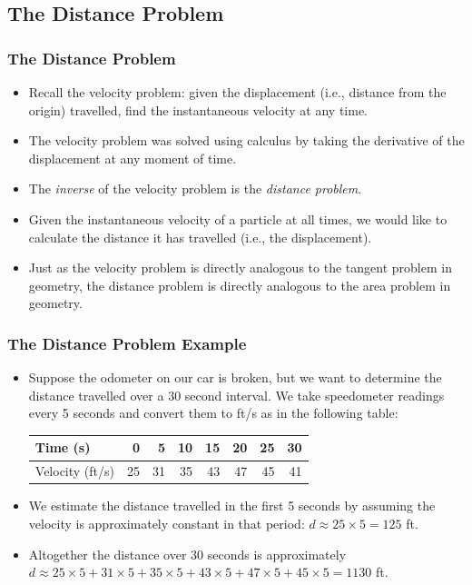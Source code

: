 \documentclass[serif,ignorenonframetext]{beamer}
\begin{document}
\subsection{The Distance Problem}

\begin{frame}
  \frametitle{The Distance Problem}
  \begin{itemize}[<+->]
  \item Recall the velocity problem: given the displacement (i.e.,
    distance from the origin) travelled, find the instantaneous
    velocity at any time.
  \item The velocity problem was solved using calculus by taking the
    derivative of the displacement at any moment of time.
  \item The \emph{inverse} of the velocity problem is the
    \emph{distance problem}.
  \item Given the instantaneous velocity of a particle at all times,
    we would like to calculate the distance it has travelled (i.e.,
    the displacement).
  \item Just as the velocity problem is directly analogous to the
    tangent problem in geometry, the distance problem is directly
    analogous to the area problem in geometry.
  \end{itemize}
\end{frame}

\begin{frame}
  \frametitle{The Distance Problem Example}
  \begin{itemize}[<+->]
  \item Suppose the odometer on our car is broken, but we want to
    determine the distance travelled over a 30 second interval.  We
    take speedometer readings every 5 seconds and convert them to ft/s
    as in the following table:
    \begin{tabular}{|l|r|r|r|r|r|r|r|}
      \hline
      Time (s) & 0 & 5 & 10 & 15 & 20 & 25 & 30 \\
      \hline
      Velocity (ft/s) & 25 & 31 & 35 & 43 & 47 & 45 & 41 \\
      \hline
    \end{tabular}
  \item We estimate the distance travelled in the first 5 seconds by
    assuming the velocity is approximately constant in that period:
    $d\approx 25\times 5=125$ ft.
  \item Altogether the distance over 30 seconds is approximately
    $d\approx 25\times 5 + 31\times 5 + 35\times 5+43\times 5+47\times
    5+45\times 5 = 1130$ ft.
  \end{itemize}
\end{frame}
\end{document}
